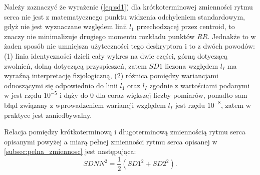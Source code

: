 Należy zaznaczyć że wyrażenie (\ref{eq:sd1}) dla krótkoterminowej zmienności rytmu serca
nie jest z matematycznego punktu widzenia odchyleniem standardowym, gdyż nie jest
wyznaczane względem linii $l_1$ przechodzącej przez centroid, to znaczy nie minimalizuje
drugiego momentu rozkładu punktów $RR$. Jednakże to w żaden sposób
nie umniejsza użyteczności tego deskryptora i to z dwóch powodów: (1) linia
identyczności dzieli cały wykres \PP{} na dwie części, górną dotyczącą zwolnień,
dolną dotyczącą przyspieszeń, zatem $SD1$ liczona względem $l_{I}$ ma wyraźną interpretację
fizjologiczną, (2) różnica pomiędzy wariancjami odnoszącymi się odpowiednio do linii $l_1$
oraz $l_{I}$ zgodnie z wartościami podanymi w \cite{poinc_jaro} jest rzędu $10^{-5}$ i
dąży do $0$ dla coraz większej liczby pomiarów, ponadto sam błąd związany z wprowadzeniem
wariancji względem $l_{I}$ jest rzędu $10^{-8}$, zatem w praktyce jest zaniedbywalny.

Relacja pomiędzy krótkoterminową i długoterminową zmiennością rytmu serca opisanymi powyżej
a miarą pełnej zmienności rytmu serca opisanej w \ref{subsec:pelna_zmiennosc}
jest następująca:
\begin{equation}
SDNN^2 = \frac{1}{2}(SD1^2 + SD2^2)\label{SDNNpartitioning}.
\end{equation}